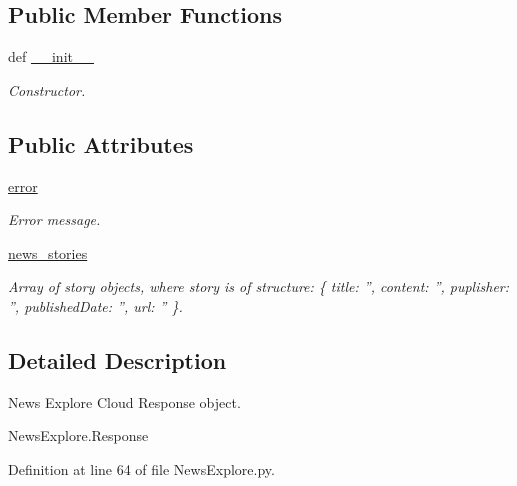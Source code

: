 \subsection*{Public Member Functions}
\begin{DoxyCompactItemize}
\item 
def \hyperlink{classRappCloud_1_1CloudMsgs_1_1NewsExplore_1_1NewsExplore_1_1Response_a0d53842942841313dbca61b0f400b1ce}{\-\_\-\-\_\-init\-\_\-\-\_\-}
\begin{DoxyCompactList}\small\item\em Constructor. \end{DoxyCompactList}\end{DoxyCompactItemize}
\subsection*{Public Attributes}
\begin{DoxyCompactItemize}
\item 
\hyperlink{classRappCloud_1_1CloudMsgs_1_1NewsExplore_1_1NewsExplore_1_1Response_a2384598da5d38362f49c57bd77f9218b}{error}
\begin{DoxyCompactList}\small\item\em Error message. \end{DoxyCompactList}\item 
\hyperlink{classRappCloud_1_1CloudMsgs_1_1NewsExplore_1_1NewsExplore_1_1Response_ab55b67a059bc5cbbd136f9b5747a7310}{news\-\_\-stories}
\begin{DoxyCompactList}\small\item\em Array of story objects, where story is of structure\-: \{ title\-: '', content\-: '', puplisher\-: '', published\-Date\-: '', url\-: '' \}. \end{DoxyCompactList}\end{DoxyCompactItemize}


\subsection{Detailed Description}
\begin{DoxyVerb}News Explore Cloud Response object.

NewsExplore.Response
\end{DoxyVerb}
 

Definition at line 64 of file News\-Explore.\-py.



